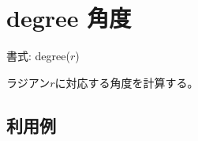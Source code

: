 
%

\section{degree 角度\label{sect:degree}}

書式: degree($r$)

ラジアン$r$に対応する角度を計算する。

\subsection*{利用例}


%

